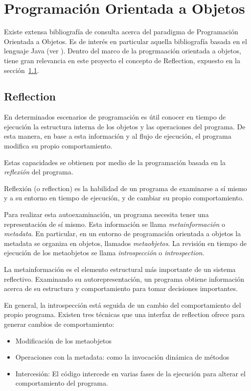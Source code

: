 \section{Programación Orientada a Objetos}

Existe extensa bibliografía de consulta acerca del paradigma de Programación
Orientada a Objetos. Es de interés en particular aquella bibliografía basada en
el lenguaje Java (ver \cite{flanagan2005java} \cite{lafore2003data}). 
Dentro del marco de la progrmaación orientada a objetos, tiene
gran relevancia en este proyecto el concepto de Reflection, expuesto en la
sección~\ref{reflection}.

\subsection{Reflection}
\label{reflection}

En determinados escenarios de programación es útil conocer en
tiempo de ejecución la estructura interna de los objetos y las operaciones del
programa. De esta manera, en base a esta información y al flujo de ejecución,
el programa modifica su propio comportamiento.

Estas capacidades se obtienen por medio de la programación basada en la
\textit{reflexión} del programa.

Reflexión (o reflection) es la habilidad de un programa de examinarse a sí
mismo y a su entorno en tiempo de ejecución, y de cambiar su propio
comportamiento.

Para realizar esta autoexaminación, un programa necesita tener una
representación de sí mismo. Esta información se llama \textit{metainformación} o
\textit{metadata}. En particular, en un entorno de programación orientada a
objetos la metadata se organiza en objetos, llamados \textit{metaobjetos}. La
revisión en tiempo de ejecución de los metaobjetos se llama
\textit{introspección} o \textit{introspection}.
\cite{Forman04javareflection}

La metainformación es el elemento estructural más importante de un
sistema reflectivo. Examinando su autorepresentación, un programa obtiene
información acerca de su estructura y comportamiento para tomar decisiones
importantes.

En general, la introspección está seguida de un cambio del comportamiento del
propio programa. Existen tres técnicas que una interfaz de reflection ofrece
para generar cambios de comportamiento:
\begin{itemize}
    \item Modificación de los metaobjetos
    \item Operaciones con la metadata: como la invocación dinámica de métodos 
    \item Intercesión: El código intercede en varias fases de la ejecución para
    alterar el comportamiento del programa.
\end{itemize}

